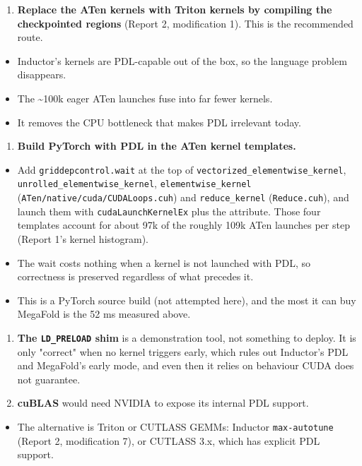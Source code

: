 \documentclass[10pt]{article}
\begin{document}
\begin{enumerate}
\item \textbf{Replace the ATen kernels with Triton kernels by compiling the checkpointed regions} (Report 2, modification 1). This is the recommended route.
\end{enumerate}
\begin{itemize}
\item Inductor's kernels are PDL-capable out of the box, so the language problem disappears.
\item The \textasciitilde{}100k eager ATen launches fuse into far fewer kernels.
\item It removes the CPU bottleneck that makes PDL irrelevant today.
\end{itemize}
\begin{enumerate}
\item \textbf{Build PyTorch with PDL in the ATen kernel templates.}
\end{enumerate}
\begin{itemize}
\item Add \texttt{griddepcontrol.wait} at the top of \texttt{vectorized\_elementwise\_kernel}, \texttt{unrolled\_elementwise\_kernel}, \texttt{elementwise\_kernel} (\texttt{ATen/native/cuda/CUDALoops.cuh}) and \texttt{reduce\_kernel} (\texttt{Reduce.cuh}), and launch them with \texttt{cudaLaunchKernelEx} plus the attribute. Those four templates account for about 97k of the roughly 109k ATen launches per step (Report 1's kernel histogram).
\item The wait costs nothing when a kernel is not launched with PDL, so correctness is preserved regardless of what precedes it.
\item This is a PyTorch source build (not attempted here), and the most it can buy MegaFold is the 52 ms measured above.
\end{itemize}
\begin{enumerate}
\item \textbf{The \texttt{LD\_PRELOAD} shim} is a demonstration tool, not something to deploy. It is only "correct" when no kernel triggers early, which rules out Inductor's PDL and MegaFold's early mode, and even then it relies on behaviour CUDA does not guarantee.
\item \textbf{cuBLAS} would need NVIDIA to expose its internal PDL support.
\end{enumerate}
\begin{itemize}
\item The alternative is Triton or CUTLASS GEMMs: Inductor \texttt{max-autotune} (Report 2, modification 7), or CUTLASS 3.x, which has explicit PDL support.
\end{itemize}
\end{document}
